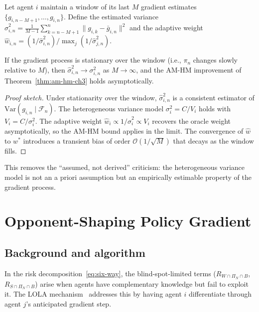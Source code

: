 \begin{proposition}
\label{prop:adaptive-ch3}
Let agent $i$ maintain a window of its last $M$ gradient estimates $\{g_{i,n-M+1}, \ldots, g_{i,n}\}$. Define the estimated variance $\hat{\sigma}_{i,n}^2 = \frac{1}{M-1}\sum_{k=n-M+1}^n \|g_{i,k} - \bar{g}_{i,n}\|^2$ and the adaptive weight $\hat{w}_{i,n} = (1/\hat{\sigma}_{i,n}^2) / \max_j(1/\hat{\sigma}_{j,n}^2)$.

If the gradient process is stationary over the window (i.e., $\pi_n$ changes slowly relative to $M$), then $\hat{\sigma}_{i,n}^2 \to \sigma_{i,n}^2$ as $M \to \infty$, and the AM-HM improvement of Theorem~\ref{thm:am-hm-ch3} holds asymptotically.
\end{proposition}

\begin{proof}[Proof sketch]
Under stationarity over the window, $\hat{\sigma}_{i,n}^2$ is a consistent estimator of $\mathrm{Var}(g_{i,n} \mid \mathcal{F}_n)$. The heterogeneous variance model $\sigma_{i}^2 = C/V_i$ holds with $V_i = C/\sigma_i^2$. The adaptive weight $\hat{w}_i \propto 1/\hat{\sigma}_i^2 \propto V_i$ recovers the oracle weight asymptotically, so the AM-HM bound applies in the limit. The convergence of $\hat{w}$ to $w^*$ introduces a transient bias of order $\mathcal{O}(1/\sqrt{M})$ that decays as the window fills.
\end{proof}

This removes the ``assumed, not derived'' criticism: the heterogeneous variance model is not an a priori assumption but an empirically estimable property of the gradient process.


\section{Opponent-Shaping Policy Gradient}
\label{sec:lola-conv}

\subsection{Background and algorithm}

In the risk decomposition~\eqref{eq:six-way}, the blind-spot-limited terms ($R_{W \cap \Pi_N \cap B}$, $R_{S \cap \Pi_N \cap B}$) arise when agents have complementary knowledge but fail to exploit it. The LOLA mechanism~\cite{foerster2018lola} addresses this by having agent $i$ differentiate through agent $j$'s anticipated gradient step.

